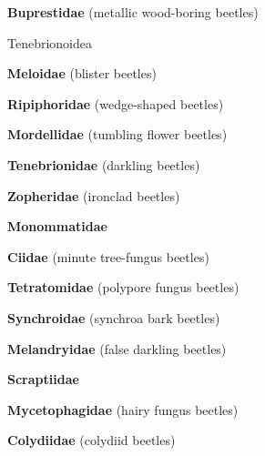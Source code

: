 \documentclass[letterpaper,10pt]{article}
\begin{document}
{\makebox[0.6cm]{}  \textbf{Buprestidae} (metallic wood-boring beetles) \par
\makebox[0.40cm]{}  Tenebrionoidea \par
\makebox[0.6cm]{}  \textbf{Meloidae} (blister beetles) \par
\makebox[0.6cm]{}  \textbf{Ripiphoridae} (wedge-shaped beetles) \par
\makebox[0.6cm]{}  \textbf{Mordellidae} (tumbling flower beetles) \par
\makebox[0.6cm]{}  \textbf{Tenebrionidae} (darkling beetles) \par
\makebox[0.6cm]{}  \textbf{Zopheridae} (ironclad beetles) \par
\makebox[0.6cm]{}  \textbf{Monommatidae} \par
\makebox[0.6cm]{}  \textbf{Ciidae} (minute tree-fungus beetles) \par
\makebox[0.6cm]{}  \textbf{Tetratomidae} (polypore fungus beetles) \par
\makebox[0.6cm]{}  \textbf{Synchroidae} (synchroa bark beetles) \par
\makebox[0.6cm]{}  \textbf{Melandryidae} (false darkling beetles) \par
\makebox[0.6cm]{}  \textbf{Scraptiidae}  \par
\makebox[0.6cm]{}  \textbf{Mycetophagidae} (hairy fungus beetles) \par
\makebox[0.6cm]{}  \textbf{Colydiidae} (colydiid beetles) \par
}
\end{document}

